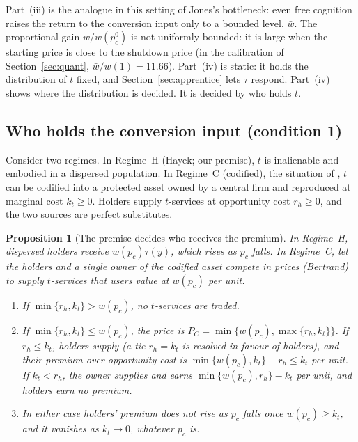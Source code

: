 \documentclass[12pt]{article}
\newtheorem{proposition}{Proposition}
\theoremstyle{remark}
\begin{document}
Part~(iii) is the analogue in this setting of Jones's bottleneck: even free cognition raises the return to the conversion input only to a bounded level, $\bar w$. The proportional gain $\bar w/w(p_c^0)$ is not uniformly bounded: it is large when the starting price is close to the shutdown price (in the calibration of Section~\ref{sec:quant}, $\bar w/w(1)=11.66$). Part~(iv) is static: it holds the distribution of $t$ fixed, and Section~\ref{sec:apprentice} lets $\tau$ respond. Part~(iv) shows where the distribution is decided. It is decided by who holds $t$.

\subsection{Who holds the conversion input (condition 1)}\label{sec:regime}

Consider two regimes. In Regime~H (Hayek; our premise), $t$ is inalienable and embodied in a dispersed population. In Regime~C (codified), the situation of \citet[\S12.4.3]{brynjolfsson2026hayek}, $t$ can be codified into a protected asset owned by a central firm and reproduced at marginal cost $k_t\ge0$. Holders supply $t$-services at opportunity cost $r_h\ge0$, and the two sources are perfect substitutes.

\begin{proposition}[The premise decides who receives the premium]\label{prop:regime}
In Regime~H, dispersed holders receive $w(p_c)\tau(y)$, which rises as $p_c$ falls. In Regime~C, let the holders and a single owner of the codified asset compete in prices (Bertrand) to supply $t$-services that users value at $w(p_c)$ per unit.
\begin{enumerate}[label=(\roman*),itemsep=0pt]
\item If $\min\{r_h,k_t\}>w(p_c)$, no $t$-services are traded.
\item If $\min\{r_h,k_t\}\le w(p_c)$, the price is $P_C=\min\{w(p_c),\max\{r_h,k_t\}\}$. If $r_h\le k_t$, holders supply (a tie $r_h=k_t$ is resolved in favour of holders), and their premium over opportunity cost is $\min\{w(p_c),k_t\}-r_h\le k_t$ per unit. If $k_t<r_h$, the owner supplies and earns $\min\{w(p_c),r_h\}-k_t$ per unit, and holders earn no premium.
\item In either case holders' premium does not rise as $p_c$ falls once $w(p_c)\ge k_t$, and it vanishes as $k_t\to0$, whatever $p_c$ is.
\end{enumerate}
\end{proposition}
\end{document}
